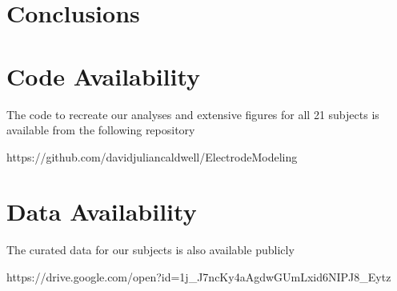 \section{Conclusions}

\section{Code Availability}
The code to recreate our analyses and extensive figures for all 21 subjects is available from the following repository 

https://github.com/davidjuliancaldwell/ElectrodeModeling

\section{Data Availability}
The curated data for our subjects is also available publicly 

https://drive.google.com/open?id=1j\_J7ncKy4aAgdwGUmLxid6NIPJ8\_Eytz


